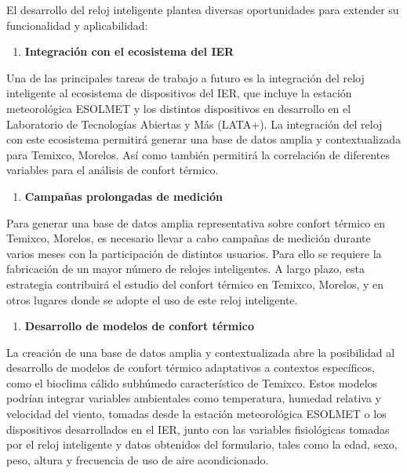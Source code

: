 \documentclass[
  12pt,
  letterpaper,
  DIV=11,
  numbers=noendperiod]{scrreport}
\providecommand{\tightlist}{%
  \setlength{\itemsep}{0pt}\setlength{\parskip}{0pt}}\usepackage{longtable,booktabs,array}
\begin{document}
El desarrollo del reloj inteligente plantea diversas oportunidades para
extender su funcionalidad y aplicabilidad:

\begin{enumerate}
\def\labelenumi{\arabic{enumi}.}
\tightlist
\item
  \textbf{Integración con el ecosistema del IER}
\end{enumerate}

Una de las principales tareas de trabajo a futuro es la integración del
reloj inteligente al ecosistema de dispositivos del IER, que incluye la
estación meteorológica ESOLMET y los distintos dispositivos en
desarrollo en el Laboratorio de Tecnologías Abiertas y Más (LATA+). La
integración del reloj con este ecosistema permitirá generar una base de
datos amplia y contextualizada para Temixco, Morelos. Así como también
permitirá la correlación de diferentes variables para el análisis de
confort térmico.

\begin{enumerate}
\def\labelenumi{\arabic{enumi}.}
\setcounter{enumi}{1}
\tightlist
\item
  \textbf{Campañas prolongadas de medición}
\end{enumerate}

Para generar una base de datos amplia representativa sobre confort
térmico en Temixco, Morelos, es necesario llevar a cabo campañas de
medición durante varios meses con la participación de distintos
usuarios. Para ello se requiere la fabricación de un mayor número de
relojes inteligentes. A largo plazo, esta estrategia contribuirá el
estudio del confort térmico en Temixco, Morelos, y en otros lugares
donde se adopte el uso de este reloj inteligente.

\begin{enumerate}
\def\labelenumi{\arabic{enumi}.}
\setcounter{enumi}{2}
\tightlist
\item
  \textbf{Desarrollo de modelos de confort térmico}
\end{enumerate}

La creación de una base de datos amplia y contextualizada abre la
posibilidad al desarrollo de modelos de confort térmico adaptativos a
contextos específicos, como el bioclima cálido subhúmedo característico
de Temixco. Estos modelos podrían integrar variables ambientales como
temperatura, humedad relativa y velocidad del viento, tomadas desde la
estación meteorológica ESOLMET o los dispositivos desarrollados en el
IER, junto con las variables fisiológicas tomadas por el reloj
inteligente y datos obtenidos del formulario, tales como la edad, sexo,
peso, altura y frecuencia de uso de aire acondicionado.
\end{document}
